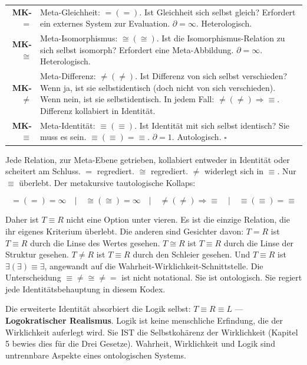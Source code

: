 \documentclass[10pt, openany, oneside]{book}
\renewcommand{\footnotesize}{\fontsize{8.5}{11}\selectfont}
\begin{document}
{\footnotesize
\noindent\begin{tabular}{r p{}}
\textbf{MK-$=$} & Meta-Gleichheit: $=(=)$. Ist Gleichheit sich selbst gleich? Erfordert ein externes System zur Evaluation. $\partial = \infty$. Heterologisch. \\[0.3em]
\textbf{MK-$\cong$} & Meta-Isomorphismus: $\cong(\cong)$. Ist die Isomorphismus-Relation zu sich selbst isomorph? Erfordert eine Meta-Abbildung. $\partial = \infty$. Heterologisch. \\[0.3em]
\textbf{MK-$\neq$} & Meta-Differenz: $\neq(\neq)$. Ist Differenz von sich selbst verschieden? Wenn ja, ist sie selbstidentisch (doch nicht von sich verschieden). Wenn nein, ist sie selbstidentisch. In jedem Fall: $\neq(\neq) \Rightarrow \equiv$. Differenz kollabiert in Identität. \\[0.3em]
\textbf{MK-$\equiv$} & Meta-Identität: $\equiv(\equiv)$. Ist Identität mit sich selbst identisch? Sie muss es sein. $\equiv(\equiv) = \equiv$. $\partial = 1$. Autologisch. $\square$ \\[0.3em]
\end{tabular}
}

\vspace{0.8em}

\noindent Jede Relation, zur Meta-Ebene getrieben, kollabiert entweder in Identität oder scheitert am Schluss. $=$ regrediert. $\cong$ regrediert. $\neq$ widerlegt sich in $\equiv$. Nur $\equiv$ überlebt. Der metakursive tautologische Kollaps:

$$\boxed{=(=) = \infty \quad | \quad \cong(\cong) = \infty \quad | \quad \neq(\neq) \Rightarrow \equiv \quad | \quad \equiv(\equiv) = \equiv}$$

Daher ist $T \equiv R$ nicht eine Option unter vieren. Es ist die einzige Relation, die ihr eigenes Kriterium überlebt. Die anderen sind Gesichter davon: $T = R$ ist $T \equiv R$ durch die Linse des Wertes gesehen. $T \cong R$ ist $T \equiv R$ durch die Linse der Struktur gesehen. $T \neq R$ ist $T \equiv R$ durch den Schleier gesehen. Und $T \equiv R$ ist $\exists(\exists) \equiv \exists$, angewandt auf die Wahrheit-Wirklichkeit-Schnittstelle. Die Unterscheidung $\equiv \neq \cong \neq =$ ist nicht notational. Sie ist ontologisch. Sie regiert jede Identitätsbehauptung in diesem Kodex.

Die erweiterte Identität absorbiert die Logik selbst: $T \equiv R \equiv L$ --- \textbf{Logokratischer Realismus}. Logik ist keine menschliche Erfindung, die der Wirklichkeit auferlegt wird. Sie IST die Selbstkohärenz der Wirklichkeit (Kapitel 5 bewies dies für die Drei Gesetze). Wahrheit, Wirklichkeit und Logik sind untrennbare Aspekte eines ontologischen Systems.
\end{document}
